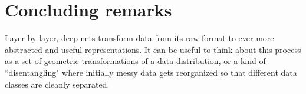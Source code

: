 \section{Concluding remarks}
Layer by layer, deep nets transform data from its raw format to ever more abstracted and useful representations. It can be useful to think about this process as a set of geometric transformations of a data distribution, or a kind of ``disentangling" where initially messy data gets reorganized so that different data classes are cleanly separated.